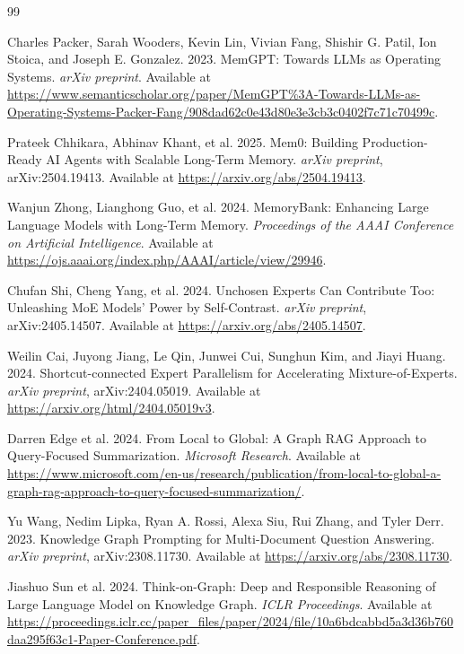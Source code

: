 \documentclass[10pt]{article}
\begin{document}
\begin{thebibliography}{99}
\small

Charles Packer, Sarah Wooders, Kevin Lin, Vivian Fang, Shishir G. Patil, Ion Stoica, and Joseph E. Gonzalez. 2023. MemGPT: Towards LLMs as Operating Systems. \emph{arXiv preprint}. Available at \url{https://www.semanticscholar.org/paper/MemGPT%3A-Towards-LLMs-as-Operating-Systems-Packer-Fang/908dad62c0e43d80e3e3cb3c0402f7c71c70499c}.

Prateek Chhikara, Abhinav Khant, et al. 2025. Mem0: Building Production-Ready AI Agents with Scalable Long-Term Memory. \emph{arXiv preprint}, arXiv:2504.19413. Available at \url{https://arxiv.org/abs/2504.19413}.

Wanjun Zhong, Lianghong Guo, et al. 2024. MemoryBank: Enhancing Large Language Models with Long-Term Memory. \emph{Proceedings of the AAAI Conference on Artificial Intelligence}. Available at \url{https://ojs.aaai.org/index.php/AAAI/article/view/29946}.

Chufan Shi, Cheng Yang, et al. 2024. Unchosen Experts Can Contribute Too: Unleashing MoE Models' Power by Self-Contrast. \emph{arXiv preprint}, arXiv:2405.14507. Available at \url{https://arxiv.org/abs/2405.14507}.

Weilin Cai, Juyong Jiang, Le Qin, Junwei Cui, Sunghun Kim, and Jiayi Huang. 2024. Shortcut-connected Expert Parallelism for Accelerating Mixture-of-Experts. \emph{arXiv preprint}, arXiv:2404.05019. Available at \url{https://arxiv.org/html/2404.05019v3}.

Darren Edge et al. 2024. From Local to Global: A Graph RAG Approach to Query-Focused Summarization. \emph{Microsoft Research}. Available at \url{https://www.microsoft.com/en-us/research/publication/from-local-to-global-a-graph-rag-approach-to-query-focused-summarization/}.

Yu Wang, Nedim Lipka, Ryan A. Rossi, Alexa Siu, Rui Zhang, and Tyler Derr. 2023. Knowledge Graph Prompting for Multi-Document Question Answering. \emph{arXiv preprint}, arXiv:2308.11730. Available at \url{https://arxiv.org/abs/2308.11730}.

Jiashuo Sun et al. 2024. Think-on-Graph: Deep and Responsible Reasoning of Large Language Model on Knowledge Graph. \emph{ICLR Proceedings}. Available at \url{https://proceedings.iclr.cc/paper_files/paper/2024/file/10a6bdcabbd5a3d36b760daa295f63c1-Paper-Conference.pdf}.


\end{thebibliography}
\end{document}

